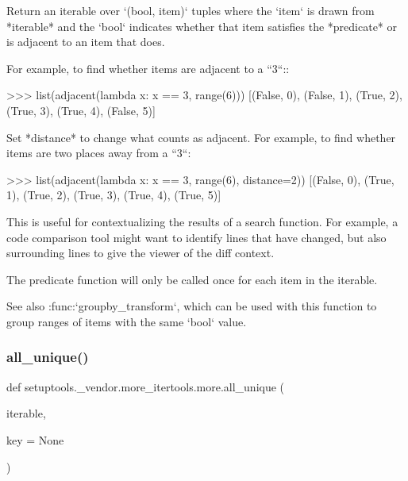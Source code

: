 \begin{DoxyVerb}Return an iterable over `(bool, item)` tuples where the `item` is
drawn from *iterable* and the `bool` indicates whether
that item satisfies the *predicate* or is adjacent to an item that does.

For example, to find whether items are adjacent to a ``3``::

    >>> list(adjacent(lambda x: x == 3, range(6)))
    [(False, 0), (False, 1), (True, 2), (True, 3), (True, 4), (False, 5)]

Set *distance* to change what counts as adjacent. For example, to find
whether items are two places away from a ``3``:

    >>> list(adjacent(lambda x: x == 3, range(6), distance=2))
    [(False, 0), (True, 1), (True, 2), (True, 3), (True, 4), (True, 5)]

This is useful for contextualizing the results of a search function.
For example, a code comparison tool might want to identify lines that
have changed, but also surrounding lines to give the viewer of the diff
context.

The predicate function will only be called once for each item in the
iterable.

See also :func:`groupby_transform`, which can be used with this function
to group ranges of items with the same `bool` value.\end{DoxyVerb}
 \mbox{\label{namespacesetuptools_1_1__vendor_1_1more__itertools_1_1more_a10d89d566c65810a4d60b21e990af600}} 
\subsubsection{\texorpdfstring{all\+\_\+unique()}{all\_unique()}}
{\footnotesize\ttfamily def setuptools.\+\_\+vendor.\+more\+\_\+itertools.\+more.\+all\+\_\+unique (\begin{DoxyParamCaption}\item[{}]{iterable,  }\item[{}]{key = {\ttfamily None} }\end{DoxyParamCaption})}

